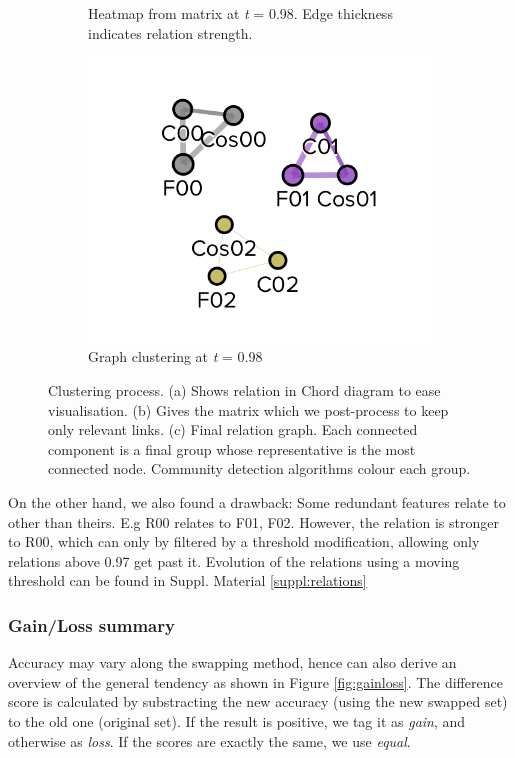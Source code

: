 \begin{figure}[!h]
\begin{subfigure}[b]{0.3\linewidth}
		\caption{Heatmap from matrix at \emph{t} = 0.98. Edge thickness indicates relation strength.}
	\end{subfigure}
	\hfill
	\begin{subfigure}[b]{0.3\linewidth}
		\includegraphics[width=\linewidth]{Minor Thesis/figures/graphs/graph-toy.png}
		\caption{Graph clustering at \emph{t} = 0.98}
	\end{subfigure}
	\label{fig:triade}
	\caption{Clustering process. (a) Shows relation in Chord diagram to ease visualisation. (b) Gives the matrix which we post-process to keep only relevant links. (c) Final relation graph. Each connected component is a final group whose representative is the most connected node. Community detection algorithms colour each group.}
\end{figure}

On the other hand, we also found a drawback: Some redundant features relate to other than theirs. E.g R00 relates to F01, F02. However, the relation is stronger to R00, which can only by filtered by a threshold modification, allowing only relations above 0.97 get past it. Evolution of the relations using a moving threshold can be found in Suppl. Material \ref{suppl:relations}

\subsubsection{Gain/Loss summary}
Accuracy may vary along the swapping method, hence can also derive an overview of the general tendency as shown in Figure \ref{fig:gainloss}. The difference score is calculated by substracting the new accuracy (using the new swapped set) to the old one (original set). If the result is positive, we tag it as \emph{gain}, and otherwise as \emph{loss}. If the scores are exactly the same, we use \emph{equal}.

